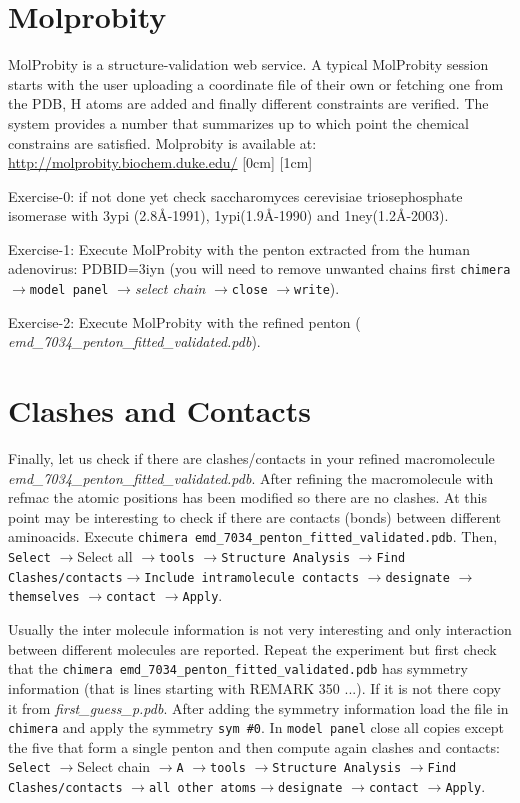 \documentclass[12pt]{article} %
\newcommand{\ttt}[1]{\texttt{#1}}
\newcommand{\iii}[1]{\textit{#1}}
\newcommand{\ra}{$\rightarrow$}
\def \humanAdenoMap {7034}%
\begin{document}
\section{Molprobity}
MolProbity is a structure-validation web service. A typical MolProbity session starts with the user uploading a coordinate file of their own or fetching one from the PDB, H atoms are added and finally different constraints are verified. The system provides a number that summarizes up to which point the chemical constrains are satisfied. Molprobity is available at: \url{http://molprobity.biochem.duke.edu/}
[0cm]
[1cm]

Exercise-0: if not done yet check saccharomyces cerevisiae triosephosphate isomerase with 3ypi (2.8\AA-1991), 1ypi(1.9\AA-1990) and 1ney(1.2\AA-2003).

Exercise-1: Execute MolProbity with the penton extracted from the human adenovirus: PDBID=3iyn (you will need to remove unwanted chains first \ttt{chimera} \ra \ttt{model panel} \ra \iii{select chain} \ra \ttt{close} \ra \ttt{write}).

Exercise-2: Execute MolProbity with the refined penton ( \iii{emd\_\humanAdenoMap\_penton\_fitted\_validated.pdb}).

\section{Clashes and Contacts}
Finally, let us check if there are clashes/contacts in your refined macromolecule  \iii{emd\_\humanAdenoMap\_penton\_fitted\_validated.pdb}. After refining the macromolecule with refmac the atomic positions has been modified so there are no clashes. At this point may be interesting to check if there are contacts (bonds) between different aminoacids. Execute \ttt{chimera emd\_\humanAdenoMap\_penton\_fitted\_validated.pdb}. Then, \ttt{Select} \ra {Select all} \ra  \ttt{tools} \ra \ttt{Structure Analysis} \ra \ttt{Find Clashes/contacts}\ra \ttt{Include intramolecule contacts} \ra \ttt{designate} \ra \ttt{themselves} \ra \ttt{contact} \ra \ttt{Apply}.

Usually the inter molecule information is not very interesting and only interaction between different 
molecules are reported. Repeat the experiment but first check that the \ttt{chimera emd\_\humanAdenoMap\_penton\_fitted\_validated.pdb} has symmetry information (that is lines starting with REMARK 350 ...). If it is not there copy it from \iii{first\_guess\_p.pdb}. After adding the symmetry information load the file in \ttt{chimera} and apply the symmetry \ttt{sym \#0}. In \ttt{model panel} close all copies except the five that form a single penton and then compute again clashes and contacts:
\ttt{Select} \ra {Select chain} \ra  \ttt{A} \ra \ttt{tools} \ra \ttt{Structure Analysis} \ra \ttt{Find Clashes/contacts}  \ra \ttt{all other atoms}\ra \ttt{designate} \ra \ttt{contact} \ra \ttt{Apply}.
\end{document}
